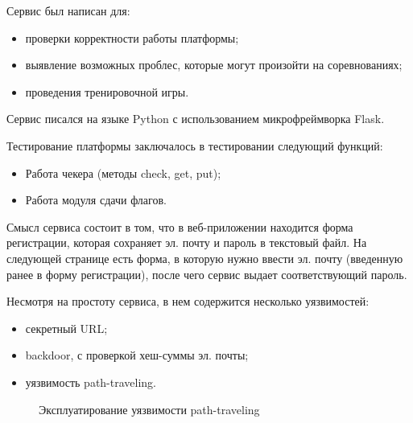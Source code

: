 Сервис был написан для:
\begin{itemize} 
\item проверки корректности работы платформы;
\item выявление возможных проблес, которые могут произойти на соревнованиях;
\item проведения тренировочной игры.
\end{itemize}

Сервис писался на языке Python с использованием микрофреймворка Flask.

Тестирование платформы заключалось в тестировании следующий функций:
\begin{itemize} 
\item Работа чекера (методы check, get, put);
\item Работа модуля сдачи флагов.
\end{itemize}

Смысл сервиса состоит в том, что в веб-приложении находится форма регистрации, которая сохраняет эл. почту и пароль в текстовый файл. На следующей странице есть форма, в которую нужно ввести эл. почту (введенную ранее в форму регистрации), после чего сервис выдает соответствующий пароль.

Несмотря на простоту сервиса, в нем содержится несколько уязвимостей:
\begin{itemize} 
\item секретный URL;
\item backdoor, с проверкой хеш-суммы эл. почты;
\item уязвимость path-traveling.
\end{itemize}

\begin{figure}[ht!]
\caption{Эксплуатирование уязвимости path-traveling}
\end{figure}